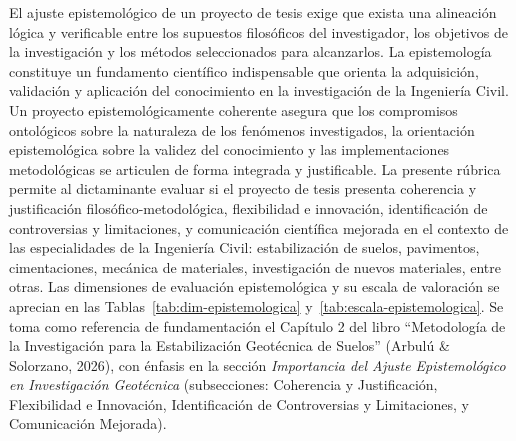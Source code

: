 {\footnotesize El ajuste epistemológico de un proyecto de tesis exige que exista una alineación lógica y verificable entre los supuestos filosóficos del investigador, los objetivos de la investigación y los métodos seleccionados para alcanzarlos. La epistemología constituye un fundamento científico indispensable que orienta la adquisición, validación y aplicación del conocimiento en la investigación de la Ingeniería Civil. Un proyecto epistemológicamente coherente asegura que los compromisos ontológicos sobre la naturaleza de los fenómenos investigados, la orientación epistemológica sobre la validez del conocimiento y las implementaciones metodológicas se articulen de forma integrada y justificable. La presente rúbrica permite al dictaminante evaluar si el proyecto de tesis presenta coherencia y justificación filosófico-metodológica, flexibilidad e innovación, identificación de controversias y limitaciones, y comunicación científica mejorada en el contexto de las especialidades de la Ingeniería Civil: estabilización de suelos, pavimentos, cimentaciones, mecánica de materiales, investigación de nuevos materiales, entre otras. Las dimensiones de evaluación epistemológica y su escala de valoración se aprecian en las Tablas~\ref{tab:dim-epistemologica} y~\ref{tab:escala-epistemologica}. Se toma como referencia de fundamentación el Capítulo 2 del libro \enquote{Metodología de la Investigación para la Estabilización Geotécnica de Suelos} (Arbulú \& Solorzano, 2026), con énfasis en la sección \textit{Importancia del Ajuste Epistemológico en Investigación Geotécnica} (subsecciones: Coherencia y Justificación, Flexibilidad e Innovación, Identificación de Controversias y Limitaciones, y Comunicación Mejorada).\par} 

